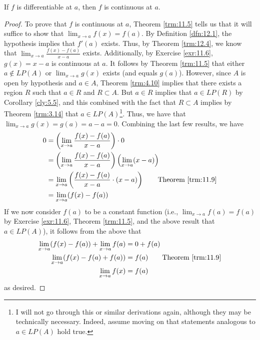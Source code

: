 \documentclass[../main.tex]{subfiles}
\begin{document}
\begin{theorem}\label{trm:12.5}
    If $f$ is differentiable at $a$, then $f$ is continuous at $a$.
    \begin{proof}
        To prove that $f$ is continuous at $a$, Theorem \ref{trm:11.5} tells us that it will suffice to show that $\lim_{x\to a}f(x)=f(a)$. By Definition \ref{dfn:12.1}, the hypothesis implies that $f'(a)$ exists. Thus, by Theorem \ref{trm:12.4}, we know that $\lim_{x\to a}\frac{f(x)-f(a)}{x-a}$ exists. Additionally, by Exercise \ref{exr:11.6}, $g(x)=x-a$ is continuous at $a$. It follows by Theorem \ref{trm:11.5} that either $a\notin LP(A)$ or $\lim_{x\to a}g(x)$ exists (and equals $g(a)$). However, since $A$ is open by hypothesis and $a\in A$, Theorem \ref{trm:4.10} implies that there exists a region $R$ such that $a\in R$ and $R\subset A$. But $a\in R$ implies that $a\in LP(R)$ by Corollary \ref{cly:5.5}, and this combined with the fact that $R\subset A$ implies by Theorem \ref{trm:3.14} that $a\in LP(A)$\footnote{I will not go through this or similar derivations again, although they may be technically necessary. Indeed, assume moving on that statements analogous to $a\in LP(A)$ hold true.}. Thus, we have that $\lim_{x\to a}g(x)=g(a)=a-a=0$. Combining the last few results, we have
        \begin{align*}
            0 &= \left( \lim_{x\to a}\frac{f(x)-f(a)}{x-a} \right)\cdot 0\\
            &= \left( \lim_{x\to a}\frac{f(x)-f(a)}{x-a} \right)\left( \lim_{x\to a}(x-a) \right)\\
            &= \lim_{x\to a}\left( \frac{f(x)-f(a)}{x-a}\cdot(x-a) \right)\tag*{Theorem \ref{trm:11.9}}\\
            &= \lim_{x\to a}(f(x)-f(a))
        \end{align*}
        If we now consider $f(a)$ to be a constant function (i.e., $\lim_{x\to a}f(a)=f(a)$ by Exercise \ref{exr:11.6}, Theorem \ref{trm:11.5}, and the above result that $a\in LP(A)$), it follows from the above that
        \begin{align*}
            \lim_{x\to a}(f(x)-f(a))+\lim_{x\to a}f(a) &= 0+f(a)\\
            \lim_{x\to a}(f(x)-f(a)+f(a)) &= f(a)\tag*{Theorem \ref{trm:11.9}}\\
            \lim_{x\to a}f(x) &= f(a)
        \end{align*}
        as desired.
    \end{proof}
\end{theorem}
\end{document}
